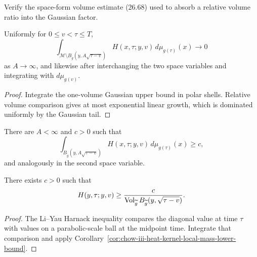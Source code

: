 \begin{claim}
\label{clm:chow-iii-space-form-volume-absorption-exercise}
Verify the space-form volume estimate (26.68) used to absorb a relative
volume ratio into the Gaussian factor.
\end{claim}

\begin{lemma}
\label{lem:chow-iii-heat-kernel-mass-concentration}
Uniformly for \(0\le v<\tau\le T\),
\[
 \int_{\mathcal M\setminus B_{\widetilde g}(y,A\sqrt{\tau-v})}
 H(x,\tau;y,v)\,d\mu_{g(\tau)}(x)\longrightarrow0
\]
as \(A\to\infty\), and likewise after interchanging the two space variables
and integrating with \(d\mu_{g(v)}\).
\end{lemma}
\begin{proof}
Integrate the one-volume Gaussian upper bound in polar shells.  Relative
volume comparison gives at most exponential linear growth, which is dominated
uniformly by the Gaussian tail.
\end{proof}

\begin{corollary}
\label{cor:chow-iii-heat-kernel-local-mass-lower-bound}
There are \(A<\infty\) and \(c>0\) such that
\[
 \int_{B_{\widetilde g}(y,A\sqrt{\tau-v})}H(x,\tau;y,v)
 \,d\mu_{g(\tau)}(x)\ge c,
\]
and analogously in the second space variable.
\end{corollary}

\begin{lemma}
\label{lem:chow-iii-evolving-heat-kernel-diagonal-lower-bound}
There exists \(c>0\) such that
\[
 H(y,\tau;y,v)\ge
 \frac{c}{\operatorname{Vol}_{\widetilde g}B_{\widetilde g}(y,\sqrt{\tau-v})}.
\]
\end{lemma}
\begin{proof}
The Li--Yau Harnack inequality compares the diagonal value at time \(\tau\)
with values on a parabolic-scale ball at the midpoint time.  Integrate that
comparison and apply Corollary~\ref{cor:chow-iii-heat-kernel-local-mass-lower-bound}.
\end{proof}

